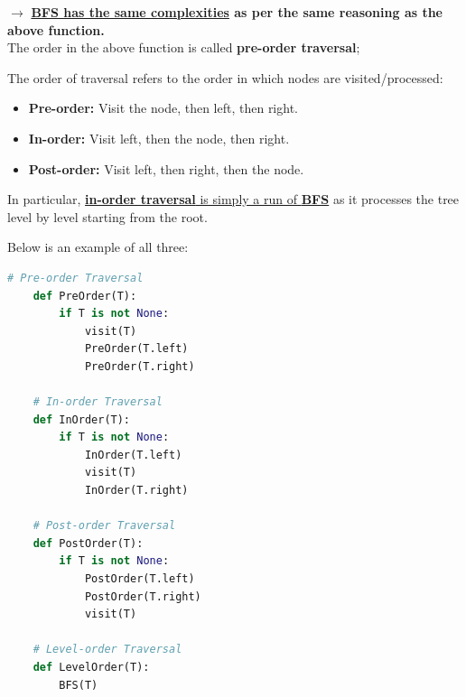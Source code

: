 \noindent
$\mathbf{\rightarrow}$ \textbf{\underline{BFS has the same complexities} as per the same reasoning as the above function.}\\

\newpage
\noindent
The order in the above function is called \textbf{pre-order traversal};

\begin{Def}

    The order of traversal refers to the order in which nodes are visited/processed:
    \begin{itemize}
        \item \textbf{Pre-order:} Visit the node, then left, then right.
        \item \textbf{In-order:} Visit left, then the node, then right.
        \item \textbf{Post-order:} Visit left, then right, then the node.
    \end{itemize}
    In particular, \underline{\textbf{in-order traversal} is simply a run of \textbf{BFS}} as it processes the tree level by level starting 
    from the root.
\end{Def}

\noindent
Below is an example of all three:

\begin{Example}

    \begin{lstlisting}[language=Python, numbers=none]
    # Pre-order Traversal
    def PreOrder(T):
        if T is not None:
            visit(T)
            PreOrder(T.left)
            PreOrder(T.right)

    # In-order Traversal
    def InOrder(T):
        if T is not None:
            InOrder(T.left)
            visit(T)
            InOrder(T.right)

    # Post-order Traversal
    def PostOrder(T):
        if T is not None:
            PostOrder(T.left)
            PostOrder(T.right)
            visit(T)

    # Level-order Traversal
    def LevelOrder(T):
        BFS(T)
    \end{lstlisting}
\end{Example}

\newpage

